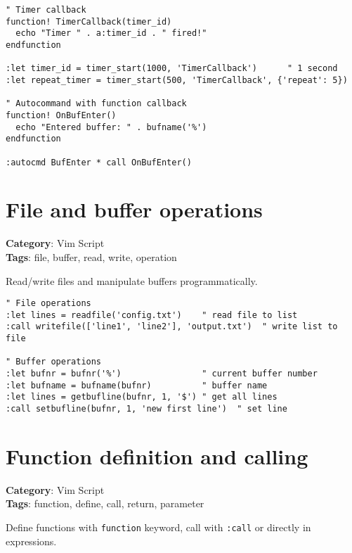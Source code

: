 {{{{{{{{{{{{{{{{{{\begin{Exa*}{}
\begin{Verbatim}[fontsize=\footnotesize, breaklines, breakanywhere]
" Timer callback
function! TimerCallback(timer_id)
  echo "Timer " . a:timer_id . " fired!"
endfunction

:let timer_id = timer_start(1000, 'TimerCallback')      " 1 second
:let repeat_timer = timer_start(500, 'TimerCallback', {'repeat': 5})

" Autocommand with function callback
function! OnBufEnter()
  echo "Entered buffer: " . bufname('%')
endfunction

:autocmd BufEnter * call OnBufEnter()
\end{Verbatim}
\end{Exa*}

\section{File and buffer operations}

\textbf{Category}: Vim Script\\ \textbf{Tags}: file, buffer, read, write, operation
\vspace{0.5cm}

Read/write files and manipulate buffers programmatically.

\begin{Exa*}{}
\begin{Verbatim}[fontsize=\footnotesize, breaklines, breakanywhere]
" File operations
:let lines = readfile('config.txt')    " read file to list
:call writefile(['line1', 'line2'], 'output.txt')  " write list to file

" Buffer operations
:let bufnr = bufnr('%')                " current buffer number
:let bufname = bufname(bufnr)          " buffer name
:let lines = getbufline(bufnr, 1, '$') " get all lines
:call setbufline(bufnr, 1, 'new first line')  " set line
\end{Verbatim}
\end{Exa*}

\section{Function definition and calling}

\textbf{Category}: Vim Script\\ \textbf{Tags}: function, define, call, return, parameter
\vspace{0.5cm}

Define functions with {\footnotesize \Verb§function§} keyword, call with {\footnotesize \Verb§:call§} or directly in expressions.

}}}}}}}}}}}}}}}}}}
